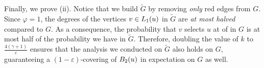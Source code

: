 \iffalse
Therefore, we obtain
\begin{align*}
    &\lrd_v - \frac{2(\lbdd_v + \gamma + 1)}{k} \ge (1-\varepsilon)\lrd_v - \frac{\varepsilon}{1+\gamma}\lbdd_v\\
    &\iff \frac{2(\lbdd_v + \gamma + 1)}{k} \leq \varepsilon \lrd_v - \frac{\varepsilon}{1 + \gamma}\lbdd_v \\
    &\iff \frac{k}{2(\lbdd_v + \gamma + 1)} \geq \frac{1+\gamma}{(1+\gamma)\varepsilon \lrd_v + \varepsilon \lbdd_v} \\
    &\iff k \geq \frac{2(1+\gamma + \lbdd_v)(1 + \gamma)}{(1 + \gamma)\varepsilon \lrd_v +\varepsilon \lbdd_v}
\end{align*}
Lastly, observe that
\begin{align*}
    k \ge \frac{2(1+\gamma)}{\varepsilon} \implies k \ge \frac{2(1+\gamma + \lbdd_v)(1 + \gamma)}{(1 + \gamma)\varepsilon \lrd_v + \varepsilon \lbdd_v} =  \frac{2(1+\gamma)}{\varepsilon} \frac{1 + \gamma + \lbdd_v}{(1+\gamma)\lrd_v + \lbdd_v}.    
\end{align*}
Therefore, property (i) is proven.
\fi


Finally, we prove (ii). Notice that we build $\widetilde{G}$ by removing \emph{only} red edges from $G$.
Since $\varphi = 1$, the degrees of the vertices $v \in L_1(u)$ in $\widetilde{G}$ are \emph{at most halved} compared to $G$. As a consequence, the probability that $v$ selects $u$ at  of  in $G$ is at most half of the probability we have in $\widetilde{G}$. Therefore, doubling the value of $k$ to $\frac{4(\gamma + 1)}{\varepsilon}$ ensures that the analysis we conducted on $\widetilde{G}$ also holds on $G$, guaranteeing a $(1-\varepsilon)$-covering of $B_2(u)$ in expectation on $G$ as well.






